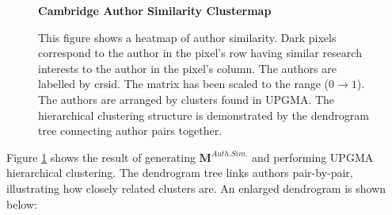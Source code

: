 \begin{center}
\begin{figure}[H]
  \centering
  \textbf{Cambridge Author Similarity Clustermap}
    \caption[Cambrdige Author Similarity Clustermap]{This figure shows a heatmap of author similarity. Dark pixels correspond to the author in the pixel's row having similar research interests to the author in the pixel's column. The authors are labelled by crsid. The matrix has been scaled to the range ($0 \rightarrow 1$).  The authors are arranged by clusters found in UPGMA. The hierarchical clustering structure is demonstrated by the dendrogram tree connecting author pairs together.}
    \label{fig:AUTHORSIMS}
\end{figure} 
\end{center}
Figure \ref{fig:AUTHORSIMS} shows the result of generating $\textbf{M}^{Auth. Sim.}$ and performing UPGMA hierarchical clustering. The dendrogram tree links authors pair-by-pair, illustrating how closely related clusters are. An enlarged dendrogram is shown below:
